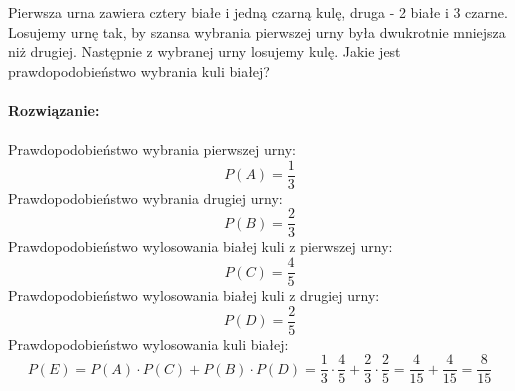 \medskip
{} 
\medskip

Pierwsza urna zawiera cztery białe i jedną czarną kulę, druga - 2 białe i 3 czarne. Losujemy urnę tak, by szansa wybrania pierwszej urny była dwukrotnie mniejsza niż drugiej. Następnie z wybranej urny losujemy kulę. Jakie jest prawdopodobieństwo wybrania kuli białej?\\\\
\textbf{Rozwiązanie:} \\\\
Prawdopodobieństwo wybrania pierwszej urny:
$$
P(A)=\frac{1}{3}
$$
Prawdopodobieństwo wybrania drugiej urny:
$$
P(B)=\frac{2}{3}
$$
Prawdopodobieństwo wylosowania białej kuli z pierwszej urny:
$$
P(C)= \frac{4}{5}
$$
Prawdopodobieństwo wylosowania białej kuli z drugiej urny:
$$
P(D)= \frac{2}{5}
$$
Prawdopodobieństwo wylosowania kuli białej:
$$
P(E)= P(A)\cdot P(C) + P(B) \cdot P(D)=\frac{1}{3} \cdot \frac{4}{5} + \frac{2}{3} \cdot \frac{2}{5}= \frac{4}{15} + \frac{4}{15} = \frac{8}{15}
$$
